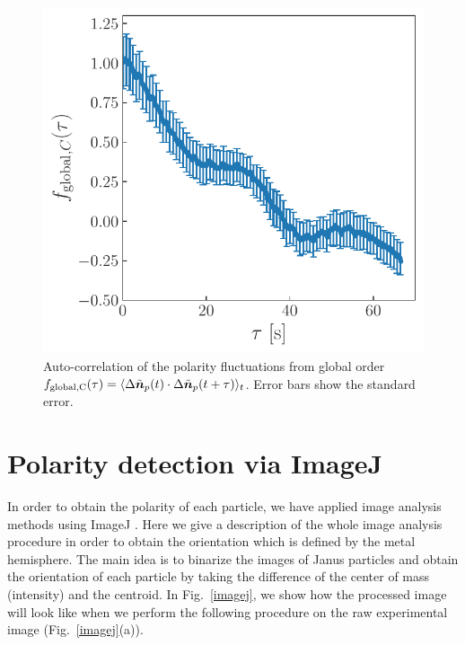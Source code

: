 \documentclass[%
 reprint,
 amsmath,amssymb,
 aps,
 floatfix
]{revtex4-2}
\begin{document}
\begin{figure}[thb]
\includegraphics[width=0.3\columnwidth]{global_order_autocorr_linear.pdf}
\caption{\label{sup_global_order} Auto-correlation of the polarity fluctuations from global order 
$f_{\rm global,C}(\tau)=\langle\Delta\tilde{\bm{n}}_p(t)\cdot\Delta\tilde{\bm{n}}_p(t+\tau)\rangle_t$. 
Error bars show the standard error.}
\end{figure}


\section{Polarity detection via ImageJ}
In order to obtain the polarity of each particle, we have applied image analysis methods
using ImageJ \cite{imagej}. 
Here we give a description of the whole image analysis procedure in order to obtain the orientation which is defined by the metal hemisphere. 
The main idea is to binarize the images of Janus particles and obtain the orientation of each particle by taking the difference of the center of mass (intensity) and the centroid. In Fig.~\ref{imagej}, we show how the processed image will look like when we perform the following procedure on the raw experimental image (Fig.~\ref{imagej}(a)).
\end{document}
